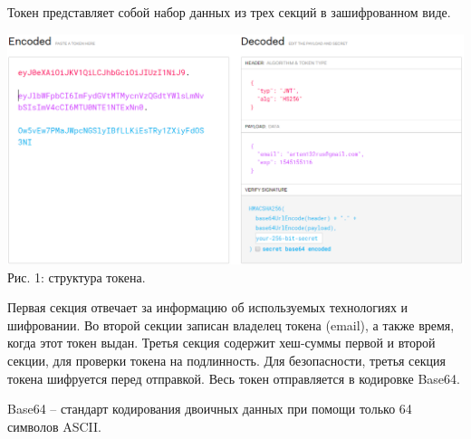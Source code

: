 \documentclass[14pt, a4paper]{extarticle}
\begin{document}
    Токен представляет собой набор данных из трех секций в зашифрованном виде.
    \begin{center}
        \includegraphics[width=\textwidth]{img/token1.png}\\
        Рис. 1: структура токена.\\[\baselineskip]
    \end{center}
    Первая секция отвечает за информацию об используемых технологиях и шифровании. Во второй секции записан владелец токена (email), а также время, когда этот токен выдан. Третья секция содержит хеш-суммы первой и второй секции, для проверки токена на подлинность. Для безопасности, третья секция токена шифруется перед отправкой. Весь токен отправляется в кодировке Base64.

    Base64 – стандарт кодирования двоичных данных при помощи только 64 символов ASCII.


    \newpage
\end{document}
